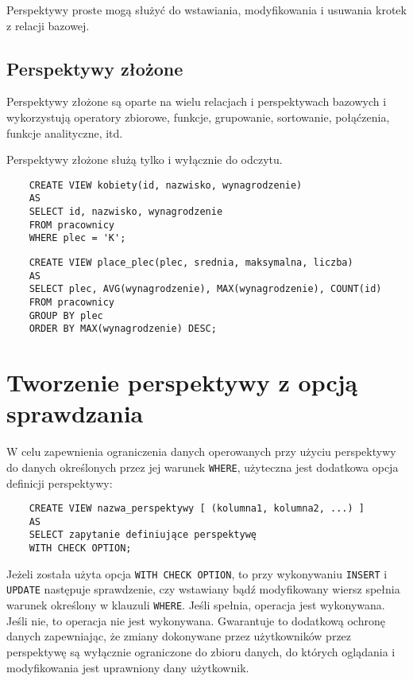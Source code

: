 \documentclass{article}
\begin{document}
Perspektywy proste mogą służyć do wstawiania, modyfikowania i usuwania krotek z relacji bazowej.

\subsection{Perspektywy złożone}

Perspektywy złożone są oparte na wielu relacjach i perspektywach bazowych i wykorzystują operatory zbiorowe, funkcje, grupowanie, sortowanie, połąćzenia, funkcje analityczne, itd.

Perspektywy złożone służą tylko i wyłącznie do odczytu.

\begin{verbatim}
    CREATE VIEW kobiety(id, nazwisko, wynagrodzenie)
    AS
    SELECT id, nazwisko, wynagrodzenie
    FROM pracownicy
    WHERE plec = 'K';
\end{verbatim}

\begin{verbatim}
    CREATE VIEW place_plec(plec, srednia, maksymalna, liczba)
    AS
    SELECT plec, AVG(wynagrodzenie), MAX(wynagrodzenie), COUNT(id)
    FROM pracownicy
    GROUP BY plec
    ORDER BY MAX(wynagrodzenie) DESC;
\end{verbatim}

\section{Tworzenie perspektywy z opcją sprawdzania}

W celu zapewnienia ograniczenia danych operowanych przy użyciu perspektywy do danych określonych przez jej warunek \texttt{WHERE}, użyteczna jest dodatkowa opcja definicji perspektywy:

\begin{verbatim}
    CREATE VIEW nazwa_perspektywy [ (kolumna1, kolumna2, ...) ]
    AS
    SELECT zapytanie definiujące perspektywę
    WITH CHECK OPTION;
\end{verbatim}

Jeżeli została użyta opcja \texttt{WITH CHECK OPTION}, to przy wykonywaniu \texttt{INSERT} i \texttt{UPDATE} następuje sprawdzenie, czy wstawiany bądź modyfikowany wiersz spełnia warunek określony w klauzuli \texttt{WHERE}. Jeśli spełnia, operacja jest wykonywana. Jeśli nie, to operacja nie jest wykonywana.
Gwarantuje to dodatkową ochronę danych zapewniając, że zmiany dokonywane przez użytkowników przez perspektywę są wyłącznie ograniczone do zbioru danych, do których oglądania i modyfikowania jest uprawniony dany użytkownik.
\end{document}
